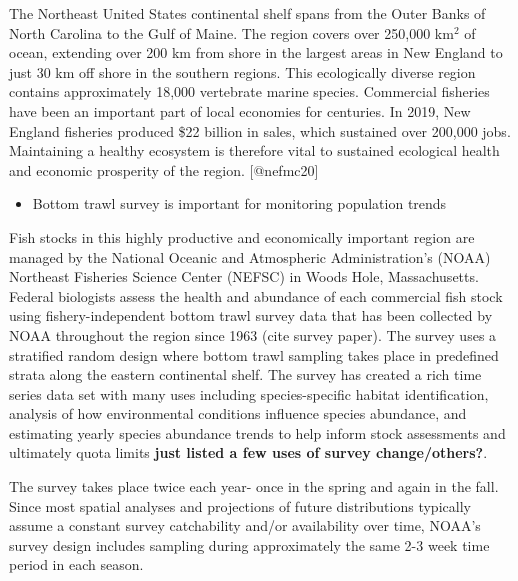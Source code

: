 \documentclass[
  12pt,
]{article}
\providecommand{\tightlist}{%
  \setlength{\itemsep}{0pt}\setlength{\parskip}{0pt}}
\begin{document}
The Northeast United States continental shelf spans from the Outer Banks of North Carolina to the Gulf of Maine. The region covers over 250,000 km\(^2\) of ocean, extending over 200 km from shore in the largest areas in New England to just 30 km off shore in the southern regions. This ecologically diverse region contains approximately 18,000 vertebrate marine species. Commercial fisheries have been an important part of local economies for centuries. In 2019, New England fisheries produced \$22 billion in sales, which sustained over 200,000 jobs. Maintaining a healthy ecosystem is therefore vital to sustained ecological health and economic prosperity of the region. {[}@nefmc20{]}

\begin{itemize}
\tightlist
\item
  Bottom trawl survey is important for monitoring population trends
\end{itemize}

Fish stocks in this highly productive and economically important region are managed by the National Oceanic and Atmospheric Administration's (NOAA) Northeast Fisheries Science Center (NEFSC) in Woods Hole, Massachusetts. Federal biologists assess the health and abundance of each commercial fish stock using fishery-independent bottom trawl survey data that has been collected by NOAA throughout the region since 1963 (cite survey paper). The survey uses a stratified random design where bottom trawl sampling takes place in predefined strata along the eastern continental shelf. The survey has created a rich time series data set with many uses including species-specific habitat identification, analysis of how environmental conditions influence species abundance, and estimating yearly species abundance trends to help inform stock assessments and ultimately quota limits \textbf{just listed a few uses of survey change/others?}.

The survey takes place twice each year- once in the spring and again in the fall. Since most spatial analyses and projections of future distributions typically assume a constant survey catchability and/or availability over time, NOAA's survey design includes sampling during approximately the same 2-3 week time period in each season.
\end{document}
